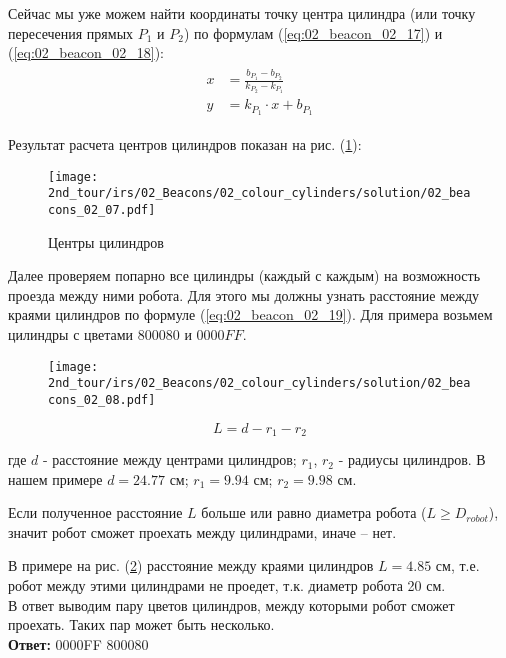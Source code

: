 Сейчас мы уже можем найти координаты точку центра цилиндра (или точку пересечения прямых $P_1$ и $P_2$) по формулам (\ref{eq:02_beacon_02_17}) и (\ref{eq:02_beacon_02_18}):
\begin{eqnarray}
\begin{aligned}
x &= \frac{b_{P_1} - b_{P_2}}{k_{P_2} - k_{P_1}}
\label{eq:02_beacon_02_17}\\
y &= k_{P_1} \cdot x + b_{P_1}
\label{eq:02_beacon_02_18}
\end{aligned}
\end{eqnarray}

Результат расчета центров цилиндров показан на рис. (\ref{fig:02_beacons_02_07}):
\begin{figure}[h!]
	\centering
	\texttt{[image: 2nd\_tour/irs/02\_Beacons/02\_colour\_cylinders/solution/02\_beacons\_02\_07.pdf]}
	\caption{Центры цилиндров}
	\label{fig:02_beacons_02_07}
\end{figure}

Далее проверяем попарно все цилиндры (каждый с каждым) на возможность проезда между ними робота. Для этого мы должны узнать расстояние между краями цилиндров по формуле (\ref{eq:02_beacon_02_19}). Для примера возьмем цилиндры с цветами $800080$ и $0000FF$.

\begin{figure}[h!]
	\centering
	\texttt{[image: 2nd\_tour/irs/02\_Beacons/02\_colour\_cylinders/solution/02\_beacons\_02\_08.pdf]}
	\caption{}
	\label{fig:02_beacons_02_08}
\end{figure}

\begin{equation}
L = d - r_1 - r_2
\label{eq:02_beacon_02_19}
\end{equation}

где $d$ - расстояние между центрами цилиндров; $r_1$, $r_2$ - радиусы цилиндров. 
В нашем примере $d = 24.77 \text{ см}$; $r_1=9.94 \text{ см}$; $r_2=9.98 \text{ см}$.

Если полученное расстояние $L$ больше или равно диаметра робота ($L \geq D_{robot}$), значит робот сможет проехать между цилиндрами, иначе – нет.

В примере на рис. (\ref{fig:02_beacons_02_08}) расстояние между краями цилиндров $L=4.85$ см, т.е. робот между этими цилиндрами не проедет, т.к. диаметр робота 20 см.
\\

В ответ выводим пару цветов цилиндров, между которыми робот сможет проехать. Таких пар может быть несколько.
\\

\textbf{Ответ: } 0000FF 800080


\codeExample

